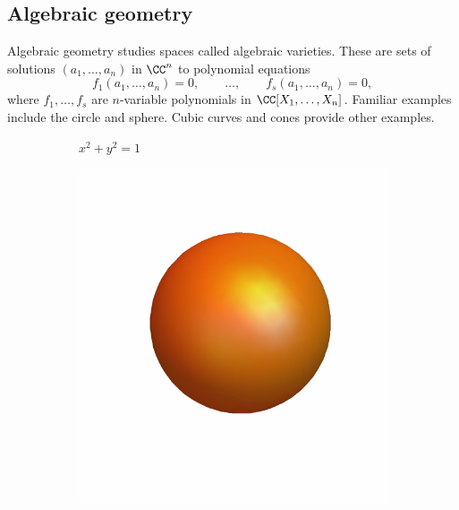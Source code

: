 \documentclass[12pt]{amsart}
\theoremstyle{plain}
\theoremstyle{definition}
\begin{document}
\subsection*{Algebraic geometry}
Algebraic geometry studies spaces called algebraic varieties.
These are sets of solutions $(a_1, \ldots, a_n)$ in $\CC^n$ to polynomial equations
$$f_1(a_1, \ldots, a_n) = 0, \qquad \ldots, \qquad f_s(a_1, \ldots, a_n) = 0,$$
where $f_1, \ldots, f_s$ are  $n$-variable polynomials in $\CC[X_1, \ldots, X_n]$.
Familiar examples include the circle and sphere.
Cubic curves and cones provide other examples.

\begin{figure}[H]
    \centering
    \begin{subfigure}[t]{0.23\textwidth}
        \centering
	\vspace{-0cm}
	  \vspace{0.2cm}
        \caption{$x^2 + y^2 = 1$}
    \end{subfigure}
    \hfill
    \begin{subfigure}[t]{0.23\textwidth}
        \centering
	\vspace*{-0.8cm}
        \includegraphics[width=\linewidth]{../images/orange_sphere}

\end{subfigure}
\end{figure}
\end{document}
